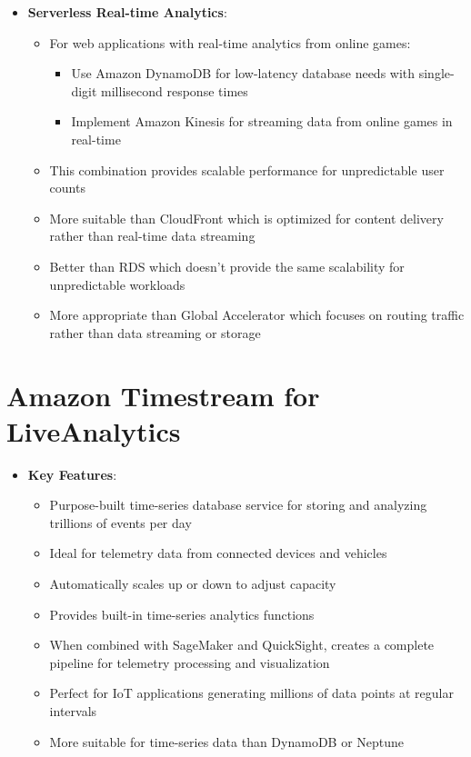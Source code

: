 \documentclass[11pt,a4paper]{report}
\begin{document}
\begin{itemize}
\begin{itemize}
  \item More suitable than batch processing with S3 for real-time transaction sharing
\end{itemize}
  \item \textbf{Serverless Real-time Analytics}:
\begin{itemize}
  \item For web applications with real-time analytics from online games:
\begin{itemize}
  \item Use Amazon DynamoDB for low-latency database needs with single-digit millisecond response times
  \item Implement Amazon Kinesis for streaming data from online games in real-time
\end{itemize}
  \item This combination provides scalable performance for unpredictable user counts
  \item More suitable than CloudFront which is optimized for content delivery rather than real-time data streaming
  \item Better than RDS which doesn't provide the same scalability for unpredictable workloads
  \item More appropriate than Global Accelerator which focuses on routing traffic rather than data streaming or storage
\end{itemize}
\end{itemize}


\section{Amazon Timestream for LiveAnalytics}

\begin{itemize}
  \item \textbf{Key Features}:
\begin{itemize}
  \item Purpose-built time-series database service for storing and analyzing trillions of events per day
  \item Ideal for telemetry data from connected devices and vehicles
  \item Automatically scales up or down to adjust capacity
  \item Provides built-in time-series analytics functions
  \item When combined with SageMaker and QuickSight, creates a complete pipeline for telemetry processing and visualization
  \item Perfect for IoT applications generating millions of data points at regular intervals
  \item More suitable for time-series data than DynamoDB or Neptune
\end{itemize}
\end{itemize}
\end{document}
